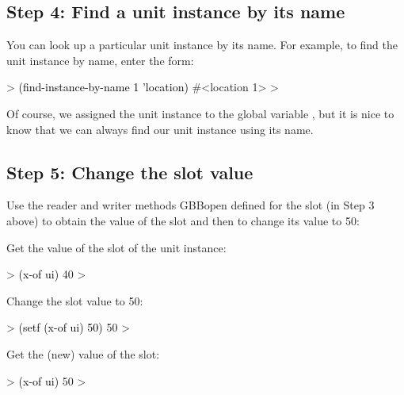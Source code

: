 \documentclass[10pt,twoside,english,pdftex]{article}
\begin{document}
\subsection*{Step 4: Find a unit instance by its name}

%
%
You can look up a particular unit instance by its name. For example, to
find the   unit instance by name, enter the form:
%
\begin{example}\color{darkergray}%
  > \textcolor{black}{(find-instance-by-name 1 'location)}
  #<location 1>
  >
\end{example}

Of course, we assigned the  unit instance to the global
variable , but it is nice to know that we can always find our unit
instance using its name.

\subsection*{Step 5: Change the  slot value}

%
%
%
%
Use the  reader and writer methods GBBopen defined for the
 slot (in Step 3 above) to obtain the value of the  slot and
then to change its value to 50:
%
\begin{tightenumerate}
\item Get the value of the  slot of the unit instance:
  \begin{example}\color{darkergray}%
    > \textcolor{black}{(x-of ui)}
    40
    >
  \end{example}
%
\item Change the slot value to 50:
  \begin{example}\color{darkergray}%
    > \textcolor{black}{(setf (x-of ui) 50)}
    50
    >
  \end{example}
\item Get the (new) value of the  slot:
  \begin{example}\color{darkergray}%
    > \textcolor{black}{(x-of ui)}
    50
    >
  \end{example}
\end{tightenumerate}
\end{document}
